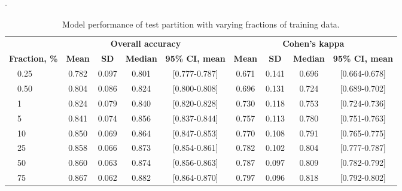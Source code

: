 \begin{table}[tb]
\begin{adjustwidth*}{}{-\marginparsep}
\begin{threeparttable}
\small
\caption[\acs{MASSC}v2 performance for fractions of data.]{Model performance of test partition with varying fractions of training data.}
\label{tab:sleep-stages:paper-ii:table-s03}
\begin{tabular}{@{}lcccccccc@{}}
\toprule
                      & \multicolumn{4}{c}{\textbf{Overall accuracy}}                         & \multicolumn{4}{c}{\textbf{Cohen’s kappa}}                            \\ \cline{2-9}
\textbf{Fraction, \%} & \textbf{Mean} & \textbf{SD} & \textbf{Median} & \textbf{95\% CI, mean} & \textbf{Mean} & \textbf{SD} & \textbf{Median} & \textbf{95\% CI, mean} \\ \midrule
\(\quad\)0.25                  & 0.782         & 0.097       & 0.801           & [0.777-0.787]         & 0.671         & 0.141       & 0.696           & [0.664-0.678]         \\
\(\quad\)0.50                  & 0.804         & 0.086       & 0.824           & [0.800-0.808]         & 0.696         & 0.131       & 0.724           & [0.689-0.702]         \\
\(\quad\)1                     & 0.824         & 0.079       & 0.840           & [0.820-0.828]         & 0.730         & 0.118       & 0.753           & [0.724-0.736]         \\
\(\quad\)5                     & 0.841         & 0.074       & 0.856           & [0.837-0.844]         & 0.757         & 0.113       & 0.780           & [0.751-0.763]         \\
\(\quad\)10                    & 0.850         & 0.069       & 0.864           & [0.847-0.853]         & 0.770         & 0.108       & 0.791           & [0.765-0.775]         \\
\(\quad\)25                    & 0.858         & 0.066       & 0.873           & [0.854-0.861]         & 0.782         & 0.102       & 0.804           & [0.777-0.787]         \\
\(\quad\)50                    & 0.860         & 0.063       & 0.874           & [0.856-0.863]         & 0.787         & 0.097       & 0.809           & [0.782-0.792]         \\
\(\quad\)75                    & 0.867         & 0.062       & 0.882           & [0.864-0.870]         & 0.797         & 0.096       & 0.818           & [0.792-0.802]         \\

\end{tabular}
\end{threeparttable}
\end{adjustwidth*}
\end{table}
